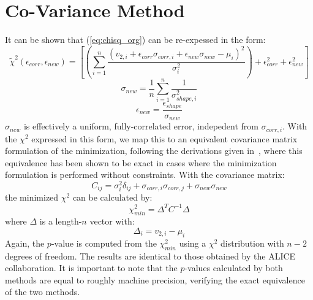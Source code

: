 \documentclass[11pt]{article}
\begin{document}
\section{Co-Variance Method}

It can be shown that (\ref{eq:chisq_org}) can be re-expessed in the form:
\begin{equation}\label{chisq_eff}
    \tilde{\chi}^2 (\epsilon_{corr}, \epsilon_{new}) = \left[ \left( \sum_{i=1}^{n} \frac{(v_{2, i} + \epsilon_{corr} \sigma_{corr, i} + \epsilon_{new} \sigma_{new} - \mu_i)^2}{\sigma^2_i} \right)+ \epsilon_{corr}^2 + \epsilon_{new}^2 \right]
\end{equation}
\begin{equation}\label{sigma_new}
    \sigma_{new} = \frac{1}{n}\sum_{i=1}^{n} \frac{1}{\sigma^2_{shape, i}}
\end{equation}
\begin{equation}\label{eps_new}
    \epsilon_{new} = \frac{\epsilon_{shape}}{\sigma_{new}}
\end{equation}
$\sigma_{new}$ is effectively a uniform, fully-correlated error, indepedent from $\sigma_{corr, i}$. With the $\chi^2$ expressed in this form, we map this to an equivalent covariance matrix formulation of the minimization, following the derivations given in~\cite{Demortier:1999aa,Gao:2014cp}, where this equivalence has been shown to be exact in cases where the minimization formulation is performed without constraints.  With the covariance matrix:
\begin{equation}\label{covariance_matrix}
    C_{ij} = \sigma_i^2 \delta_{ij} + \sigma_{corr, i} \sigma_{corr, j} + \sigma_{new} \sigma_{new}
\end{equation}
the minimized $\chi^2$ can be calculated by:
\begin{equation}\label{cov_mat_chi2_min}
    \chi_{min}^2 = \Delta^T C^{-1} \Delta
\end{equation}
where $\Delta$ is a length-$n$ vector with:
\begin{equation}\label{delta_def}
    \Delta_i = v_{2, i} - \mu_i
\end{equation}
Again, the $p$-value is computed from the $\chi_{min}^2$ using a $\chi^2$ distribution with $n - 2$ degrees of freedom. The results are identical to those obtained by the ALICE collaboration. It is important to note that the $p$-values calculated by both methods are equal to roughly machine precision, verifying the exact equivalence of the two methods.
\end{document}
